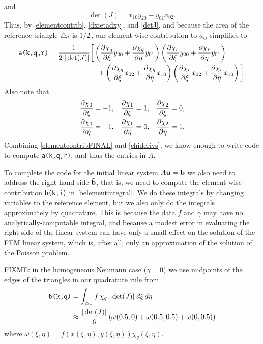 and
\begin{equation}
\det(J) = x_{10} y_{20} - y_{01} x_{02}. \label{detJ}
\end{equation}
Thus, by \eqref{elementcontrib}, \eqref{dxietadxy}, and \eqref{detJ}, and because the area of the reference triangle $\triangle_\ast$ is $1/2$\,, our element-wise contribution to $\tilde a_{ij}$ simplifies to
\begin{align}
\text{\texttt{a(k,q,r)}} = \frac{1}{2\; |\det(J)|} &\bigg[\left(\frac{\partial \chi_q}{\partial \xi} y_{20} + \frac{\partial \chi_q}{\partial \eta} y_{01}\right) \left(\frac{\partial \chi_r}{\partial \xi} y_{20} + \frac{\partial \chi_r}{\partial \eta} y_{01}\right) \label{elementcontribFINAL} \\
&\quad + \left(\frac{\partial \chi_q}{\partial \xi} x_{02} + \frac{\partial \chi_q}{\partial \eta} x_{10}\right) \left(\frac{\partial \chi_r}{\partial \xi} x_{02} + \frac{\partial \chi_r}{\partial \eta} x_{10}\right)\bigg]. \notag
\end{align}
Also note that
\begin{align}
\frac{\partial \chi_0}{\partial \xi} &= -1, & \frac{\partial \chi_1}{\partial \xi} &= 1, & \frac{\partial \chi_2}{\partial \xi} &= 0, \label{chiderivs} \\
\frac{\partial \chi_0}{\partial \eta} &= -1, & \frac{\partial \chi_1}{\partial \eta} &= 0, & \frac{\partial \chi_2}{\partial \eta} &= 1. \notag
\end{align}
Combining \eqref{elementcontribFINAL} and \eqref{chiderivs}, we know enough to write code to compute \texttt{a(k,q,r)}, and thus the entries in $\tilde A$.

To complete the code for the initial linear system $\tilde A \mathbf{u} = \tilde{\mathbf{b}}$ we also need to address the right-hand side $\tilde{\mathbf{b}}$, that is, we need to compute the element-wise contribution \texttt{b(k,i)} in \eqref{belementintegral}.  We do these integrals by changing variables to the reference element, but we also only do the integrals approximately by quadrature.  This is because the data $f$ and $\gamma$ may have no analytically-computable integral, and because a modest error in evaluating the right side of the linear system can have only a small effect on the solution of the FEM linear system, which is, after all, only an approximation of the solution of the Poisson problem.

FIXME: in the homogeneous Neumann case ($\gamma=0$) we use midpoints of the edges of the triangles in our quadrature rule from \citet{Ciarlet2002}
\begin{align*}
\text{\texttt{b(k,q)}} &= \int_{\triangle_\ast} f\, \chi_q \; |\det(J)| \; d\xi \, d\eta \\
  &\approx \frac{|\det(J)|}{6} \left(\omega(0.5,0) + \omega(0.5,0.5) + \omega(0,0.5)\right)
\end{align*}
where $\omega(\xi,\eta) = f(x(\xi,\eta),y(\xi,\eta)) \chi_q(\xi,\eta)$.

